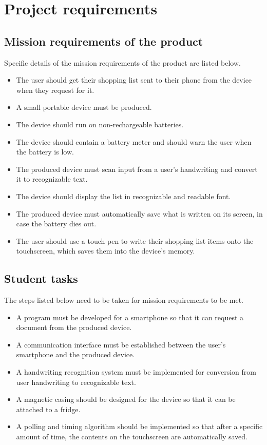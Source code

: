 {\section{Project requirements}

\subsection{Mission requirements of the product}
Specific details of the mission requirements of the product are listed below.
\begin{itemize}
	\item The user should get their shopping list sent to their phone from the device when they request for it.
	\item A small portable device must be produced.
	\item The device should run on non-rechargeable batteries.
	\item The device should contain a battery meter and should warn the user when the battery is low.
	\item The produced device must scan input from a user's handwriting and convert it to recognizable text.
	\item The device should display the list in recognizable and readable font.
	\item The produced device must automatically save what is written on its screen, in case the battery dies out.
	\item The user should use a touch-pen to write their shopping list items onto the touchscreen, which saves them into the device's memory.
\end{itemize}
\subsection{Student tasks}
The steps listed below need to be taken for mission requirements to be met.
\begin{itemize}
	\item A program must be developed for a smartphone so that it can request a document from the produced device.
	\item A communication interface must be established between the user's smartphone and the produced device.
	\item A handwriting recognition system must be implemented for conversion from user handwriting to recognizable text. 
	\item A magnetic casing should be designed for the device so that it can be attached to a fridge.
	\item A polling and timing algorithm should be implemented so that after a specific amount of time, the contents on the touchscreen are automatically saved.
\end{itemize}
\newpage

}
